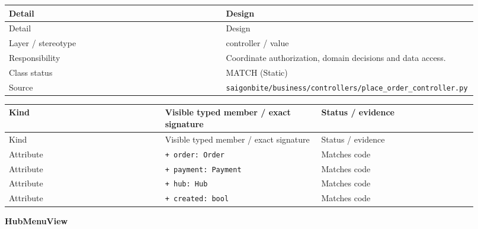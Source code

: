 \begin{longtable}{>{\raggedright\arraybackslash}p{0.4600\linewidth}>{\raggedright\arraybackslash}p{0.4600\linewidth}}
Detail & Design \\
\hline\endfirsthead
Detail & Design \\
\hline\endhead
Layer / stereotype & controller / \guillemotleft{}value\guillemotright{} \\
Responsibility & Coordinate authorization, domain decisions and data access. \\
Class status & MATCH (Static) \\
Source & \texttt{saigonbite/\allowbreak{}business/\allowbreak{}controllers/\allowbreak{}place\_\allowbreak{}order\_\allowbreak{}controller.\allowbreak{}py} \\
\end{longtable}
\begin{longtable}{>{\raggedright\arraybackslash}p{0.3067\linewidth}>{\raggedright\arraybackslash}p{0.3067\linewidth}>{\raggedright\arraybackslash}p{0.3067\linewidth}}
Kind & Visible typed member / exact signature & Status / evidence \\
\hline\endfirsthead
Kind & Visible typed member / exact signature & Status / evidence \\
\hline\endhead
Attribute & \texttt{+ order: Order} & Matches code \\
Attribute & \texttt{+ payment: Payment} & Matches code \\
Attribute & \texttt{+ hub: Hub} & Matches code \\
Attribute & \texttt{+ created: bool} & Matches code \\
\end{longtable}
\textbf{HubMenuView}

